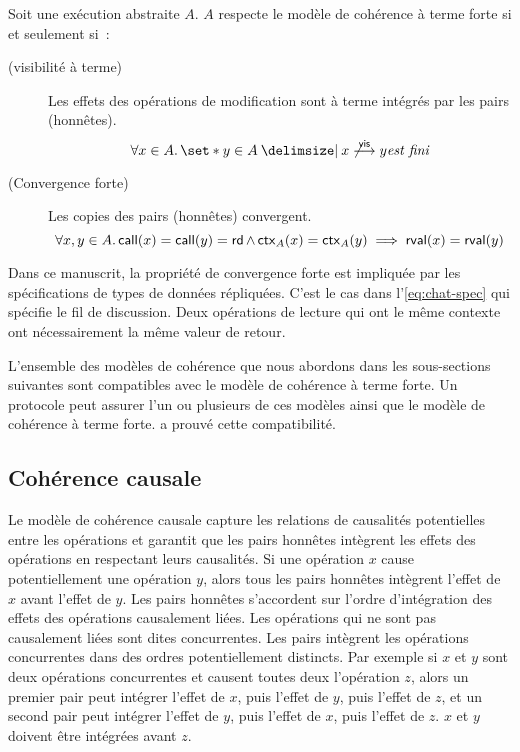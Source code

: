 \begin{definition}\label{def:strong-eventual-consistency}
    Soit une exécution abstraite $A$. $A$ respecte le modèle de cohérence à terme forte si et seulement si~:

    \begin{description}
    \item[ (visibilité à terme)]
    Les effets des opérations de modification sont à terme intégrés par les pairs (honnêtes).
    \begin{equation*}
        \forall x \in A \qsep \set*{y \in A \given x \not\vis y} \textit{est fini}
    \end{equation*}

    \item[ (Convergence forte)]
    Les copies des pairs (honnêtes) convergent.
    \begin{equation*}
        \forall x, y \in A \ldotp \operatorname{\mathsf{call}}(x) = \operatorname{\mathsf{call}}(y) = \operatorname{\mathsf{rd}} \land \operatorname{\mathsf{ctx}}_A(x) = \operatorname{\mathsf{ctx}}_A(y) \implies \operatorname{\mathsf{rval}}(x) = \operatorname{\mathsf{rval}}(y)
    \end{equation*}
    \end{description}
\end{definition}

Dans ce manuscrit, la propriété de convergence forte est impliquée par les spécifications de types de données répliquées.
C'est le cas dans l'\autoref{eq:chat-spec} qui spécifie le fil de discussion.
Deux opérations de lecture qui ont le même contexte ont nécessairement la même valeur de retour.

L'ensemble des modèles de cohérence que nous abordons dans les sous-sections suivantes sont compatibles avec le modèle de cohérence à terme forte.
Un protocole peut assurer l'un ou plusieurs de ces modèles ainsi que le modèle de cohérence à terme forte.
\textcite{mahajan_2011_cac} a prouvé cette compatibilité.


\subsection{Cohérence causale}\label{subsec:caucal-consistency}

Le modèle de cohérence causale capture les relations de causalités potentielles entre les opérations et garantit que les pairs honnêtes intègrent les effets des opérations en respectant leurs causalités.
Si une opération $x$ cause potentiellement une opération $y$, alors tous les pairs honnêtes intègrent l'effet de $x$ avant l'effet de $y$.
Les pairs honnêtes s'accordent sur l'ordre d'intégration des effets des opérations causalement liées.
Les opérations qui ne sont pas causalement liées sont dites concurrentes.
Les pairs intègrent les opérations concurrentes dans des ordres potentiellement distincts.
Par exemple si $x$ et $y$ sont deux opérations concurrentes et causent toutes deux l'opération $z$, alors un premier pair peut intégrer l'effet de $x$, puis l'effet de $y$, puis l'effet de $z$, et un second pair peut intégrer l'effet de $y$, puis l'effet de $x$, puis l'effet de $z$.
$x$ et $y$ doivent être intégrées avant $z$.

